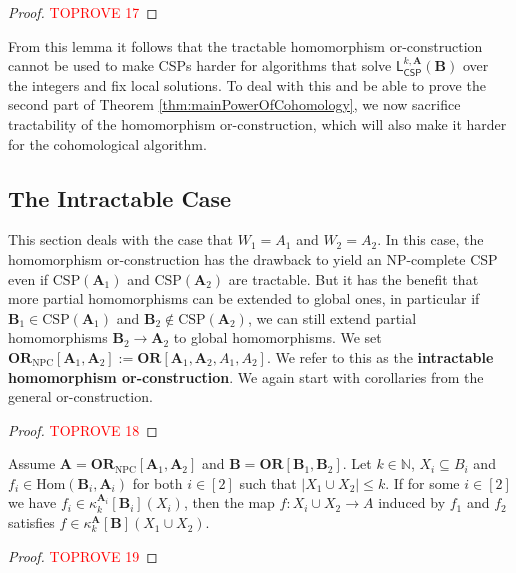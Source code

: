 \documentclass[a4paper,english, thm-restate]{lipics-v2021}
\newcommand{\nat}{\mathbb{N}}
\newcommand{\defining}[1]{\textbf{#1}}
\newcommand{\StructA}{\mathbf{A}}
\newcommand{\StructB}{\mathbf{B}}
\newcommand{\CSP}[1]{\mathrm{CSP}(#1)}
\newcommand{\kcol}[3]{\kappa_{#1}^{#2}[#3]}
\newcommand{\Hom}[2]{\mathrm{Hom}(#1,#2)}
\newcommand{\leqs}{\mathsf{L}}
\newcommand{\cspiso}[3]{\leqs^{#1,#2}_{\mathsf{CSP}}(#3)}
\newcommand{\ORparam}[1]{\mathbf{OR}[#1]}
\newcommand{\ORNPC}[1]{\mathbf{OR}_\text{NPC}[#1]}
\newcommand{\OR}[1]{\mathbf{OR}[#1]}
\begin{document}
	\integerSolutionWithLocalFixingSolvesBi*
	\begin{proof}\textcolor{red}{TOPROVE 17}\end{proof}
	
	\noindent From this lemma it follows that the tractable homomorphism or-construction 
	cannot be used to make CSPs harder for algorithms that solve $\cspiso{k}{\StructA}{\StructB}$ over the integers
	and fix local solutions.
	To deal with this and be able to prove the second part of Theorem \ref{thm:mainPowerOfCohomology}, we now sacrifice tractability of the homomorphism or-construction, which will also make it harder for the cohomological algorithm.
	
	
	
	\subsection{The Intractable Case}
	\label{app:intractable-or}
	This section deals with the case that $W_1 =A_1$ and $W_2 = A_2$.
	In this case, the homomorphism or-construction has the drawback to yield an NP-complete CSP even if $\CSP{\StructA_1}$ and $\CSP{\StructA_2}$ are tractable.
	But it has the benefit that more partial homomorphisms can be extended to global ones, in particular if $\StructB_1\in\CSP{\StructA_1}$ and $\StructB_2 \notin \CSP{\StructA_2}$,
	we can still extend partial homomorphisms $\StructB_2 \to \StructA_2$ to
	global homomorphisms.
	We set $\ORNPC{\StructA_1,\StructA_2} := \ORparam{\StructA_1,\StructA_2,A_1,A_2}$.
	We refer to this as the \defining{intractable homomorphism or-construction}.
	We again start with corollaries from the general or-construction.
	
	\homOrIntractableCompose*
	\begin{proof}\textcolor{red}{TOPROVE 18}\end{proof}
	
	\begin{lemma}
		\label{lem:hom-or-intractable-k-consistency}
		Assume $\StructA=\ORNPC{\StructA_1,\StructA_2}$
		and $\StructB = \OR{\StructB_1,\StructB_2}$.
		Let $k \in \nat$, $X_i \subseteq B_i$  and $f_i \in \Hom{\StructB_i}{\StructA_i}$ for both $i\in[2]$
		such that $|X_1 \cup X_2|\leq k$.
		If for some $i\in [2]$
		we have $f_i \in \kcol{k}{\StructA_i}{\StructB_i}(X_i)$,
		then the map $f\colon X_i\cup X_2 \to A$ induced by $f_1$ and $f_2$
		satisfies $f \in \kcol{k}{\StructA}{\StructB}(X_1 \cup X_2)$.
	\end{lemma}
	\begin{proof}\textcolor{red}{TOPROVE 19}\end{proof}
	
\end{document}
